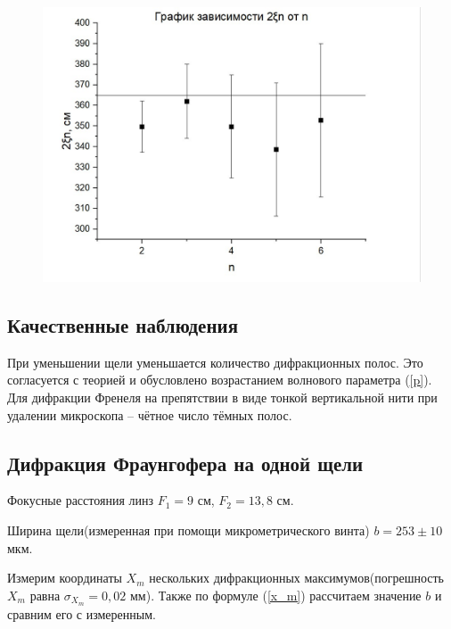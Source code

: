 \documentclass[a4paper,12pt]{article}
\begin{document}
\begin{figure}[H]
	\centering
	\includegraphics[scale=0.75]{graph1.jpg}
	\label{graph1}
\end{figure}

\subsection{Качественные наблюдения}
При уменьшении щели уменьшается количество дифракционных 
полос. Это согласуется с теорией и обусловлено возрастанием 
волнового параметра (\ref{p}). 
Для дифракции Френеля на препятствии в виде тонкой вертикальной 
нити при удалении микроскопа – чётное число тёмных полос.

\subsection{Дифракция Фраунгофера на одной щели}
Фокусные расстояния линз $F_1 = 9$ см, $F_2 = 13,8$ см.

Ширина щели(измеренная при помощи микрометрического винта) $b = 253 \pm 10$ мкм.

Измерим координаты $X_m$ нескольких дифракционных максимумов(погрешность $X_m$ равна $\sigma_{X_m} = 0,02$ мм). Также по формуле (\ref{x_m}) рассчитаем значение $b$ и сравним его с измеренным.
\end{document}
